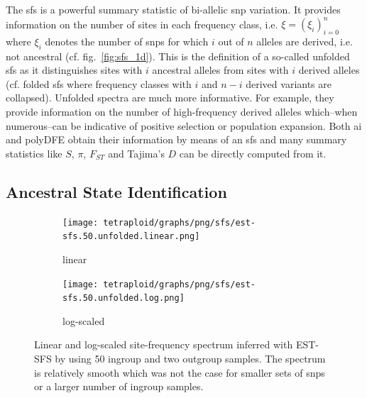 \documentclass[hidelinks,11pt]{article}
\newcommand{\dadi}{\textdelta a\textdelta i}
\begin{document}
{    The \acrfull{sfs} is a powerful summary statistic of bi-allelic \acrshort{snp} variation. It provides information on the number of sites in each frequency class, i.e. $\xi = (\xi_i)^n_{i=0}$ where $\xi_i$ denotes the number of \acrshort{snp}s for which $i$ out of $n$ alleles are derived, i.e. not ancestral (cf. fig.~\ref{fig:sfs_1d}). This is the definition of a so-called unfolded \acrshort{sfs} as it distinguishes sites with $i$ ancestral alleles from sites with $i$ derived alleles (cf. folded \acrshort{sfs} where frequency classes with $i$ and $n-i$ derived variants are collapsed). Unfolded spectra are much more informative. For example, they provide information on the number of high-frequency derived alleles which--when numerous--can be indicative of positive selection or population expansion. Both \dadi{} and polyDFE obtain their information by means of an \acrshort{sfs} and many summary statistics like $S$, $\pi$, $F_{ST}$ and Tajima's $D$ can be directly computed from it.

    \subsection{Ancestral State Identification}
    \label{sec:ancestral-identification}

    \begin{figure}[ht]
        \centering
        \begin{subfigure}[b]{0.52\textwidth}
            \centering
            \texttt{[image: tetraploid/graphs/png/sfs/est-sfs.50.unfolded.linear.png]}
            \caption{linear}
            \label{fig:est_sfs_linear}
        \end{subfigure}
        \hspace{-2em}
        \begin{subfigure}[b]{0.52\textwidth}
            \centering
            \texttt{[image: tetraploid/graphs/png/sfs/est-sfs.50.unfolded.log.png]}
            \caption{log-scaled}
            \label{fig:est_sfs_log}
        \end{subfigure}
        \caption{Linear and log-scaled site-frequency spectrum inferred with EST-SFS by using 50 ingroup and two outgroup samples. The spectrum is relatively smooth which was not the case for smaller sets of \acrshort{snp}s or a larger number of ingroup samples.}
        \label{fig:est_sfs}
    \end{figure}

}
\end{document}
